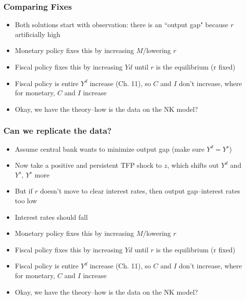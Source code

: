 \documentclass{beamer}
\begin{document}
\begin{frame}
\frametitle[alignment=center]{Comparing Fixes }
\begin{itemize}
\item Both solutions start with observation: there is an ``output gap" because $r$ artificially high
\bigskip
\item Monetary policy fixes this by increasing $M$/lowering $r$
\bigskip
\item Fiscal policy fixes this by increasing $Yd$ until $r$ is the equilibrium (r fixed)
\bigskip
\item Fiscal policy is entire $Y^d$ increase (Ch. 11), so $C$ and $I$ don't increase, where for monetary, $C$ and $I$ increase 
\bigskip
\item Okay, we have the theory--how is the data on the NK model?
\end{itemize}
\end{frame}


\begin{frame}
\frametitle[alignment=center]{Can we replicate the data? }
\begin{itemize}
\item Assume central bank wants to minimize output gap (make sure $Y^d=Y^s$)
\bigskip
\item Now take a positive and persistent TFP shock to $z$, which shifts out $Y^d$ and $Y^s$, $Y^s$ more
\bigskip
\item But if $r$ doesn't move to clear interest rates, then output gap--interest rates too low
\bigskip
\item Interest rates should fall
\bigskip
\item Monetary policy fixes this by increasing $M$/lowering $r$
\bigskip
\item Fiscal policy fixes this by increasing $Yd$ until $r$ is the equilibrium (r fixed)
\bigskip
\item Fiscal policy is entire $Y^d$ increase (Ch. 11), so $C$ and $I$ don't increase, where for monetary, $C$ and $I$ increase 
\bigskip
\item Okay, we have the theory--how is the data on the NK model?
\end{itemize}
\end{frame}
\end{document}
